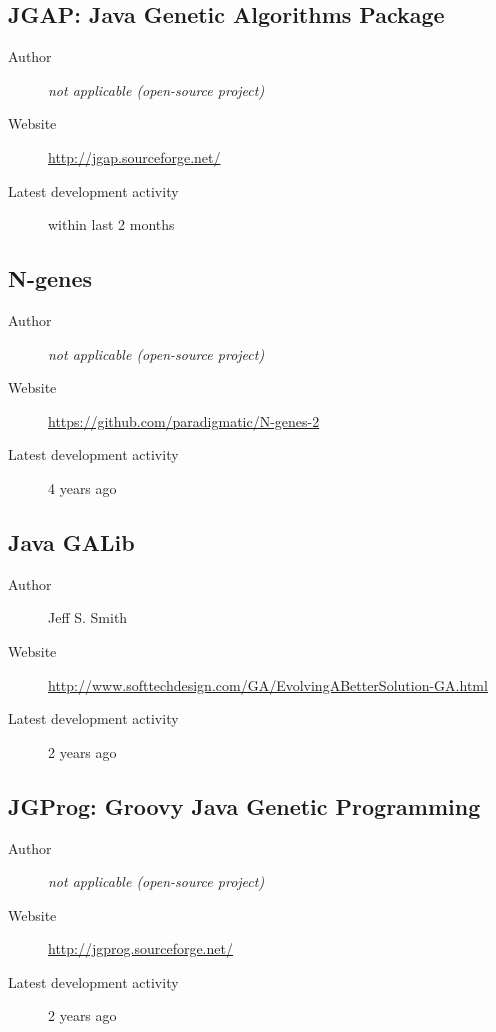 \subsection*{JGAP: Java Genetic Algorithms Package}
\begin{description}
    \item[Author] \textit{not applicable (open-source project)}
    \item[Website] \url{http://jgap.sourceforge.net/}
    \item[Latest development activity] within last 2 months
\end{description}


\subsection*{N-genes}
\begin{description}
    \item[Author] \textit{not applicable (open-source project)}
    \item[Website] \url{https://github.com/paradigmatic/N-genes-2}
    \item[Latest development activity] 4 years ago
\end{description}


\subsection*{Java GALib}
\begin{description}
    \item[Author] Jeff S. Smith
    \item[Website] \url{http://www.softtechdesign.com/GA/EvolvingABetterSolution-GA.html}
    \item[Latest development activity] 2 years ago
\end{description}


\subsection*{JGProg: Groovy Java Genetic Programming}
\begin{description}
    \item[Author] \textit{not applicable (open-source project)}
    \item[Website] \url{http://jgprog.sourceforge.net/}
    \item[Latest development activity] 2 years ago
\end{description}


